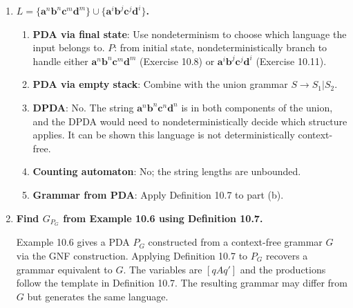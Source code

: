 \begin{enumerate}[{10.}1. ]
\textbf{Step}: Assume $P(k)$ for all $k < n$. A derivation $A^{st}\DRightarrow x$ of length $n$ begins with $A^{st} \Rightarrow a B_1^{s_0 s_1} B_2^{s_1 s_2}\cdots B_m^{s_{m-1} t}$ (using a production from $\delta(s,a,A)\ni\langle s_0,B_1\cdots B_m\rangle$). Then each $B_i^{s_{i-1}s_i}$ independently derives $x_i$ in fewer than $n$ steps. By IH, $\langle s_{i-1},x_i,B_i\rangle\Dvdash\langle s_i,\lambda,\lambda\rangle$. Chaining: $\langle s,ax_1\cdots x_m,A\rangle\vdash\langle s_0,x_1\cdots x_m,B_1\cdots B_m\rangle\Dvdash\langle t,\lambda,\lambda\rangle$. So $x = ax_1\cdots x_m$ and $\langle s,x,A\rangle\Dvdash\langle t,\lambda,\lambda\rangle$. \qed

\item \textbf{$L=\{\pmb{a}^n\pmb{b}^n\pmb{c}^m\pmb{d}^m\}\cup\{\pmb{a}^i\pmb{b}^j\pmb{c}^j\pmb{d}^i\}$.}

\begin{enumerate}
\item \textbf{PDA via final state}: Use nondeterminism to choose which language the input belongs to.
$P$: from initial state, nondeterministically branch to handle either $\pmb{a}^n\pmb{b}^n\pmb{c}^m\pmb{d}^m$ (Exercise 10.8) or $\pmb{a}^i\pmb{b}^j\pmb{c}^j\pmb{d}^i$ (Exercise 10.11).

\item \textbf{PDA via empty stack}: Combine with the union grammar $S \to S_1 | S_2$.

\item \textbf{DPDA}: No. The string $\pmb{a}^n\pmb{b}^n\pmb{c}^n\pmb{d}^n$ is in both components of the union, and the DPDA would need to nondeterministically decide which structure applies. It can be shown this language is not deterministically context-free.

\item \textbf{Counting automaton}: No; the string lengths are unbounded.

\item \textbf{Grammar from PDA}: Apply Definition 10.7 to part (b).
\end{enumerate}

\item \textbf{Find $G_{P_G}$ from Example 10.6 using Definition 10.7.}

Example 10.6 gives a PDA $P_G$ constructed from a context-free grammar $G$ via the GNF construction. Applying Definition 10.7 to $P_G$ recovers a grammar equivalent to $G$. The variables are $[q A q']$ and the productions follow the template in Definition 10.7. The resulting grammar may differ from $G$ but generates the same language.


\end{enumerate}
